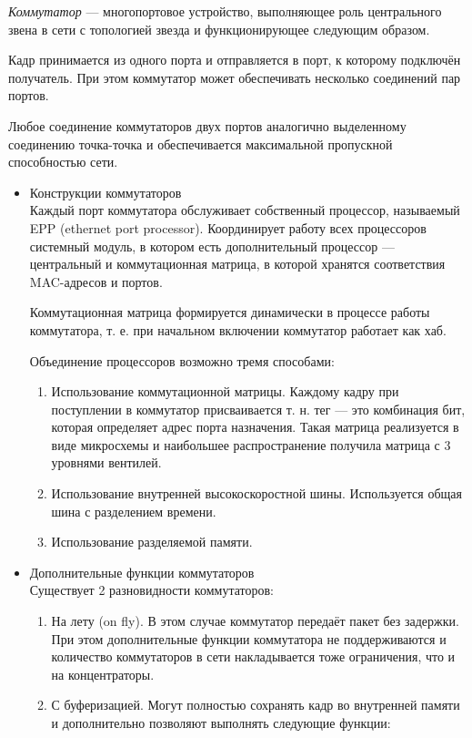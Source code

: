 \documentclass[12pt, russian, oneside, article]{ncc}
\begin{document}
\emph{Коммутатор} --- многопортовое устройство, выполняющее роль центрального звена в сети с топологией звезда и функционирующее следующим образом.

Кадр принимается из одного порта и отправляется в порт, к которому подключён получатель. При этом коммутатор может обеспечивать несколько соединений пар портов.

Любое соединение коммутаторов двух портов аналогично выделенному соединению точка-точка и обеспечивается максимальной пропускной способностью сети.
\begin{itemize}

\item Конструкции коммутаторов\\
\label{sec-4_8_4_1}%
Каждый порт коммутатора обслуживает собственный процессор, называемый EPP (ethernet port processor). Координирует работу всех процессоров системный модуль, в котором есть дополнительный процессор --- центральный и коммутационная матрица, в которой хранятся соответствия MAC-адресов и портов.

Коммутационная матрица формируется динамически в процессе работы коммутатора, т. е. при начальном включении коммутатор работает как хаб.

Объединение процессоров возможно тремя способами:
\begin{enumerate}
\item Использование коммутационной матрицы. Каждому кадру при поступлении в коммутатор присваивается т. н. тег --- это комбинация бит, которая определяет адрес порта назначения. Такая матрица реализуется в виде микросхемы и наибольшее распространение получила матрица с 3 уровнями вентилей.
\item Использование внутренней высокоскоростной шины. Используется общая шина с разделением времени.
\item Использование разделяемой памяти.
\end{enumerate}


\item Дополнительные функции коммутаторов\\
\label{sec-4_8_4_2}%
Существует 2 разновидности коммутаторов:
\begin{enumerate}
\item На лету (on fly). В этом случае коммутатор передаёт пакет без задержки. При этом дополнительные функции коммутатора не поддерживаются и количество коммутаторов в сети накладывается тоже ограничения, что и на концентраторы.
\item С буферизацией. Могут полностью сохранять кадр во внутренней памяти и дополнительно позволяют выполнять следующие функции:


\end{enumerate}
\end{itemize}
\end{document}

